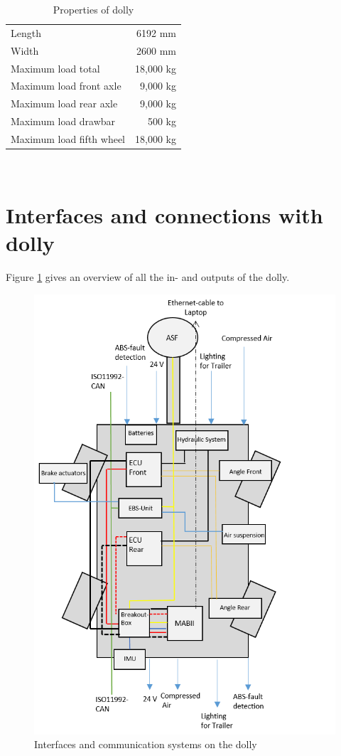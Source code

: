 \documentclass[ExampleMasters.tex]{subfiles}
\begin{document}
\begin{table}[!htb]
	\centering
	\caption{Properties of dolly}
	\label{tab:dolly_prop}
	\begin{tabular}{l r}
		Length   & 6192 mm   \\ 
		Width   &       2600 mm     \\
		Maximum load total   &      18,000 kg   \\
		Maximum load front axle &      9,000 kg      \\
		Maximum load rear axle& 9,000 kg  \\
		Maximum load drawbar& 500 kg  \\
		Maximum load fifth wheel& 18,000 kg  \\
	\end{tabular} \\
\end{table}


\section{Interfaces and connections with dolly}
\label{sec:interface_with_dolly}
Figure \ref{fig:dolly_interfaces} gives an overview of all the in- and outputs of the dolly.

\begin{figure}[!htb]
\centering
	\includegraphics[width=0.5\linewidth]{figures/ExampleCover}
	\caption{Interfaces and communication systems on the dolly}
	\label{fig:dolly_interfaces}
\end{figure}
\end{document}
